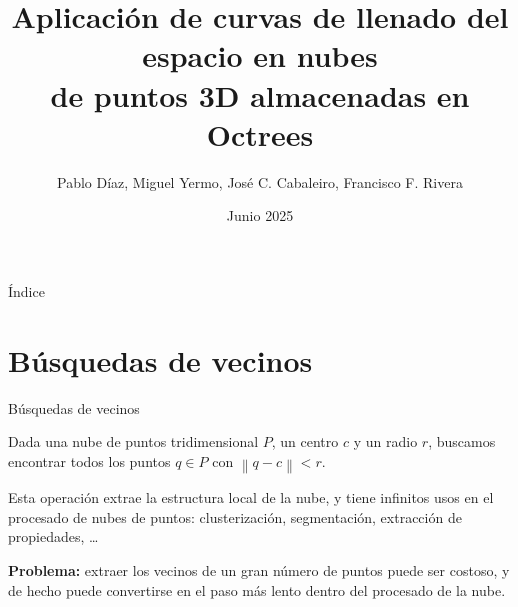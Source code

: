 \documentclass[aspectratio=169]{beamer}
\title{Aplicación de curvas de llenado del espacio en nubes \\ de puntos 3D almacenadas en Octrees}
\author{Pablo Díaz, Miguel Yermo, José C. Cabaleiro, Francisco F. Rivera}
\date{Junio 2025}
\def\toctitle{Índice}
\begin{document}
\begin{frame}[plain]%
    \titlepage%
    
\end{frame}
  
\begin{frame}[plain]{\toctitle}
    \tableofcontents
\end{frame}
\setcounter{framenumber}{0} %

\section{Búsquedas de vecinos}

\begin{frame}{Búsquedas de vecinos}

Dada una nube de puntos tridimensional $P$, un centro $c$ y un radio $r$, buscamos encontrar todos los puntos $q \in P$ con $\left\lVert q-c \right\rVert < r$.

Esta operación extrae la estructura local de la nube, y tiene infinitos usos en el procesado de nubes de puntos: clusterización, segmentación, extracción de propiedades, \dots
\vspace{2em}

\textbf{Problema:} extraer los vecinos de un gran número de puntos puede ser costoso, y de hecho puede convertirse en el paso más lento dentro del procesado de la nube.
\end{frame}
\end{document}
